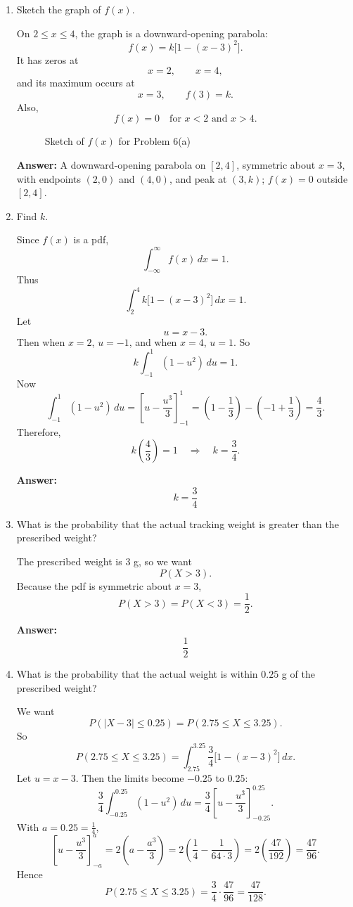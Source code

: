 \documentclass[11pt]{article}
\begin{document}
\begin{enumerate}
    \item[(a)] Sketch the graph of \(f(x)\).

    On \(2\le x\le 4\), the graph is a downward-opening parabola:
    \[
    f(x)=k\bigl[1-(x-3)^2\bigr].
    \]
    It has zeros at
    \[
    x=2,\qquad x=4,
    \]
    and its maximum occurs at
    \[
    x=3,\qquad f(3)=k.
    \]
    Also,
    \[
    f(x)=0 \quad \text{for } x<2 \text{ and } x>4.
    \]

    \begin{figure}[ht]
    \centering
    \vspace{2in}
    \caption{Sketch of \(f(x)\) for Problem 6(a)}
    \end{figure}

    \textbf{Answer:} A downward-opening parabola on \([2,4]\), symmetric about \(x=3\), with endpoints \((2,0)\) and \((4,0)\), and peak at \((3,k)\); \(f(x)=0\) outside \([2,4]\).

    \item[(b)] Find \(k\).

    Since \(f(x)\) is a pdf,
    \[
    \int_{-\infty}^{\infty} f(x)\,dx=1.
    \]
    Thus
    \[
    \int_2^4 k\bigl[1-(x-3)^2\bigr]\,dx=1.
    \]
    Let
    \[
    u=x-3.
    \]
    Then when \(x=2\), \(u=-1\), and when \(x=4\), \(u=1\). So
    \[
    k\int_{-1}^{1}(1-u^2)\,du=1.
    \]
    Now
    \[
    \int_{-1}^{1}(1-u^2)\,du
    =\left[u-\frac{u^3}{3}\right]_{-1}^{1}
    =\left(1-\frac13\right)-\left(-1+\frac13\right)
    =\frac43.
    \]
    Therefore,
    \[
    k\left(\frac43\right)=1
    \quad \Rightarrow \quad
    k=\frac34.
    \]

    \textbf{Answer:}
    \[
    \boxed{k=\frac34}
    \]

    \item[(c)] What is the probability that the actual tracking weight is greater than the prescribed weight?

    The prescribed weight is \(3\) g, so we want
    \[
    P(X>3).
    \]
    Because the pdf is symmetric about \(x=3\),
    \[
    P(X>3)=P(X<3)=\frac12.
    \]

    \textbf{Answer:}
    \[
    \boxed{\frac12}
    \]

    \item[(d)] What is the probability that the actual weight is within \(0.25\) g of the prescribed weight?

    We want
    \[
    P(|X-3|\le 0.25)=P(2.75\le X\le 3.25).
    \]
    So
    \[
    P(2.75\le X\le 3.25)=\int_{2.75}^{3.25}\frac34\bigl[1-(x-3)^2\bigr]\,dx.
    \]
    Let \(u=x-3\). Then the limits become \(-0.25\) to \(0.25\):
    \[
    \frac34\int_{-0.25}^{0.25}(1-u^2)\,du
    =\frac34\left[u-\frac{u^3}{3}\right]_{-0.25}^{0.25}.
    \]
    With \(a=0.25=\frac14\),
    \[
    \left[u-\frac{u^3}{3}\right]_{-a}^{a}
    =2\left(a-\frac{a^3}{3}\right)
    =2\left(\frac14-\frac{1}{64\cdot 3}\right)
    =2\left(\frac{47}{192}\right)
    =\frac{47}{96}.
    \]
    Hence
    \[
    P(2.75\le X\le 3.25)=\frac34\cdot \frac{47}{96}
    =\frac{47}{128}.
    \]


\end{enumerate}
\end{document}
